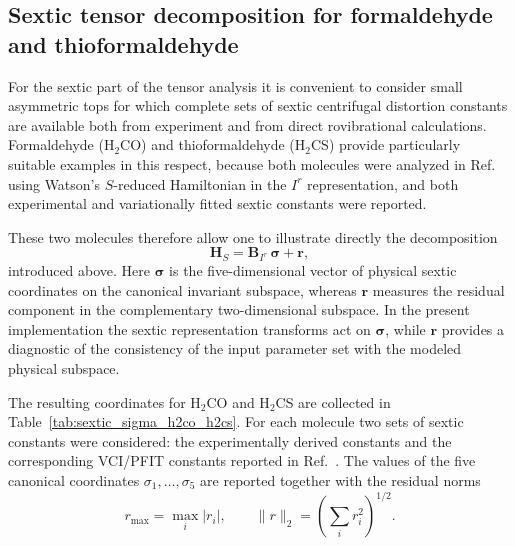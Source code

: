 \subsection{Sextic tensor decomposition for formaldehyde and thioformaldehyde}

For the sextic part of the tensor analysis it is convenient to consider
small asymmetric tops for which complete sets of sextic centrifugal
distortion constants are available both from experiment and from direct
rovibrational calculations.  Formaldehyde (H$_2$CO) and thioformaldehyde
(H$_2$CS) provide particularly suitable examples in this respect, because
both molecules were analyzed in Ref.~ using Watson's
$S$-reduced Hamiltonian in the $I^r$ representation, and both experimental
and variationally fitted sextic constants were reported.

These two molecules therefore allow one to illustrate directly the
decomposition
\[
\mathbf H_S = \mathbf B_{I^r}\,\boldsymbol\sigma + \mathbf r,
\]
introduced above.  Here $\boldsymbol\sigma$ is the five-dimensional vector
of physical sextic coordinates on the canonical invariant subspace, whereas
$\mathbf r$ measures the residual component in the complementary
two-dimensional subspace.  In the present implementation the sextic
representation transforms act on $\boldsymbol\sigma$, while $\mathbf r$
provides a diagnostic of the consistency of the input parameter set with the
modeled physical subspace.

The resulting coordinates for H$_2$CO and H$_2$CS are collected in
Table~\ref{tab:sextic_sigma_h2co_h2cs}.  For each molecule two sets of
sextic constants were considered: the experimentally derived constants and
the corresponding VCI/PFIT constants reported in Ref.~.
The values of the five canonical coordinates $\sigma_1,\ldots,\sigma_5$ are
reported together with the residual norms
\[
r_{\max}=\max_i |r_i|,
\qquad
\|r\|_2 = \left(\sum_i r_i^2\right)^{1/2}.
\]

